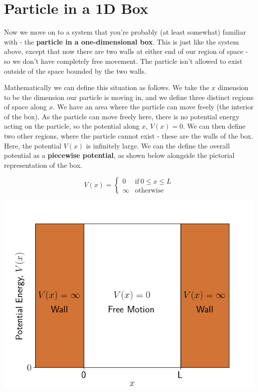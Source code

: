 \documentclass{memoir}[11pt,oneside,a4paper,openany]
\begin{document}
\section{Particle in a 1D Box}
Now we move on to a system that you're probably (at least somewhat) familiar with - the \textbf{particle in a one-dimensional box}. This is just like the system above, except that now there are two walls at either end of our region of space - so we don't have completely free movement. The particle isn't allowed to exist outside of the space bounded by the two walls.

Mathematically we can define this situation as follows. We take the $x$ dimension to be the dimension our particle is moving in, and we define three distinct regions of space along $x$. We have an area where the particle can move freely (the interior of the box). As the particle can move freely here, there is no potential energy acting on the particle, so the potential along $x$, $V(x)=0$. We can then define two other regions, where the particle cannot exist - these are the walls of the box. Here, the potential $V(x)$ is infinitely large. We can the define the overall potential as a \textbf{piecewise potential}, as shown below alongside the pictorial representation of the box. 

\begin{minipage}[c]{0.35\textwidth}
	\begin{equation*}
		 V(x) = \begin{cases} 0 &\mbox{if}~ 0\leq x \leq L \\ \infty & \mbox{otherwise} \end{cases}
	\end{equation*}
\end{minipage}
\begin{minipage}[c]{0.64\textwidth}
	\centering
	\includegraphics[width=\textwidth]{particle_box_walls.png}
\end{minipage}
\end{document}
